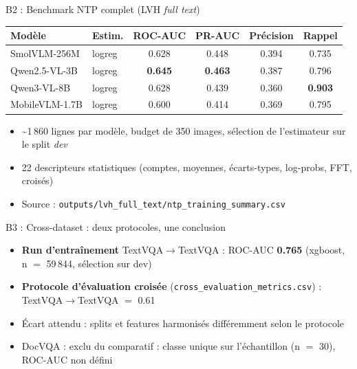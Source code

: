 \begin{frame}{B2 : Benchmark NTP complet (LVH \textit{full text})}
  \centering
  {\small
  \begin{tabular}{@{}l l c c c c@{}}
    \toprule
    \textbf{Modèle} & \textbf{Estim.} & \textbf{ROC-AUC} & \textbf{PR-AUC} & \textbf{Précision} & \textbf{Rappel} \\
    \midrule
    SmolVLM-256M    & logreg & 0.628 & 0.448 & 0.394 & 0.735 \\
    Qwen2.5-VL-3B   & logreg & \textbf{0.645} & \textbf{0.463} & 0.387 & 0.796 \\
    Qwen3-VL-8B     & logreg & 0.628 & 0.439 & 0.360 & \textbf{0.903} \\
    MobileVLM-1.7B  & logreg & 0.600 & 0.414 & 0.369 & 0.795 \\
    \bottomrule
  \end{tabular}}
  \vspace{0.3cm}

  \begin{itemize}
    \item \textasciitilde 1\,860 lignes par modèle, budget de 350 images, sélection de l'estimateur sur le split \textit{dev}
    \item 22 descripteurs statistiques (comptes, moyennes, écarts-types, log-probs, FFT, croisés)
    \item Source : \texttt{outputs/lvh\_full\_text/ntp\_training\_summary.csv}
  \end{itemize}
\end{frame}

\begin{frame}{B3 : Cross-dataset : deux protocoles, une conclusion}
  \begin{itemize}
    \item \textbf{Run d'entraînement} TextVQA$\rightarrow$TextVQA : ROC-AUC \textbf{0.765} (xgboost, n $=$ 59\,844, sélection sur dev)
    \item \textbf{Protocole d'évaluation croisée} (\texttt{cross\_evaluation\_metrics.csv}) : TextVQA$\rightarrow$TextVQA $=$ 0.61
    \item Écart attendu : splits et features harmonisés différemment selon le protocole
  \end{itemize}
  \vspace{0.2cm}
  \vspace{0.2cm}
  \begin{itemize}
    \item DocVQA : exclu du comparatif : classe unique sur l'échantillon (n $=$ 30), ROC-AUC non défini
  \end{itemize}
\end{frame}

